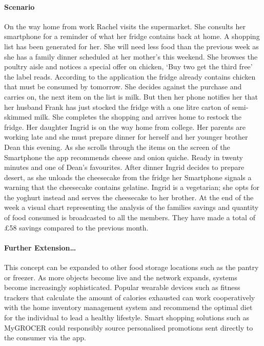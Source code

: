 \documentclass[a4paper, 11pt]{article}
\begin{document}
\paragraph{Scenario}On the way home from work Rachel visits the supermarket. She consults her smartphone for a reminder of what her fridge contains back at home. A shopping list has been generated for her. She will need less food than the previous week as she has a family dinner scheduled at her mother's this weekend. She browses the poultry aisle and notices a special offer on chicken, `Buy two get the third free' the label reads. According to the application the fridge already contains chicken that must be consumed by tomorrow. She decides against the purchase and carries on, the next item on the list is milk. But then her phone notifies her that her husband Frank has just stocked the fridge with a one litre carton of semi-skimmed milk. She completes the shopping and arrives home to restock the fridge. Her daughter Ingrid is on the way home from college. Her parents are working late and she must prepare dinner for herself and her younger brother Dean this evening. As she scrolls through the items on the screen of the Smartphone the app recommends cheese and onion quiche. Ready in twenty minutes and one of Dean's favourites. After dinner Ingrid decides to prepare desert, as she unloads the cheesecake from the fridge her Smartphone signals a warning that the cheesecake contains gelatine. Ingrid is a vegetarian; she opts for the yoghurt instead and serves the cheesecake to her brother. At the end of the week a visual chart representing the analysis of the families savings and quantity of food consumed is broadcasted to all the members. They have made a total of \pounds58 savings compared to the previous month. 

\paragraph{Further Extension\dots} This concept can be expanded to other food storage locations such as the pantry or freezer. As more objects become live and the network expands, systems become increasingly sophisticated. Popular wearable devices such as fitness trackers that calculate the amount of calories exhausted can work cooperatively with the home inventory management system and recommend the optimal diet for the individual to lead a healthy lifestyle. Smart shopping solutions such as MyGROCER\cite{myGrocer} could responsibly source personalised promotions sent directly to the consumer via the app.
\end{document}
